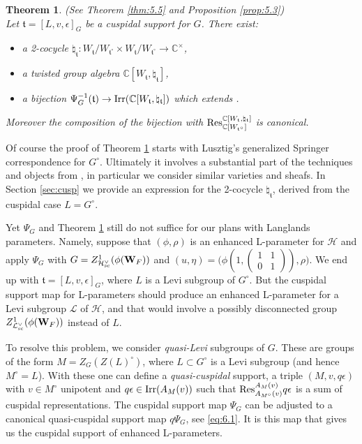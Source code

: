 \documentclass[11pt]{amsart}
\newtheorem{thmintro}{Theorem}
\theoremstyle{definition}
\newcommand{\mb}{\mathbf}
\newcommand{\C}{\mathbb C}
\newcommand{\matje}[4]{\left(\begin{smallmatrix} #1 & #2 \\ 
#3 & #4 \end{smallmatrix}\right)}
\def\Irr{{\rm Irr}}
\def\cL{{\mathcal L}}
\def\cH{{\mathcal H}}
\def\ft{{\mathfrak t}}
\def\Res{{\rm Res}}
\def\sc{{\rm sc}}
\begin{document}
\begin{thmintro}\label{thm:D} 
(See Theorem \ref{thm:5.5} and Proposition \ref{prop:5.3}) \\
Let $\ft = [L,v,\epsilon]_G$ be a cuspidal support for $G$. There exist:
\begin{itemize}
\item a 2-cocycle $\natural_\ft\colon  W_\ft / W_{\ft^\circ} \times  
W_\ft / W_{\ft^\circ} \to \C^\times$,
\item a twisted group algebra $\C [W_\ft,\natural_\ft]$,
\item a bijection $\Psi_G^{-1}(\ft) \to \Irr (\C [W_\ft,\natural_\ft])$
which extends \cite{Lus1}.
\end{itemize}
Moreover the composition of the bijection with 
$\Res^{\C [W_\ft,\natural_\ft]}_{\C [W_{\ft^\circ}]}$ is canonical.
\end{thmintro}

Of course the proof of Theorem \ref{thm:D} starts with Lusztig's generalized
Springer correspondence for $G^\circ$. Ultimately it involves a substantial
part of the techniques and objects from \cite{Lus1}, in particular we consider
similar varieties and sheafs. In Section \ref{sec:cusp} we provide an expression
for the 2-cocycle $\natural_\ft$, derived from the cuspidal case $L = G^\circ$.

Yet $\Psi_G$ and Theorem \ref{thm:D} still do not suffice for our plans with 
Langlands parameters. Namely, suppose that $(\phi,\rho)$ is an enhanced L-parameter
for $\cH$ and apply $\Psi_G$ with $G = Z^1_{\cH^\vee_\sc}(\phi (\mb W_F))$ and 
$(u,\eta) = \big( \phi (1,\matje{1}{1}{0}{1}), \rho \big)$. We end up with 
$\ft = [L,v,\epsilon]_G$, where $L$ is a Levi subgroup of $G^\circ$. But the
cuspidal support map for L-parameters should produce an enhanced L-parameter for
a Levi subgroup $\cL$ of $\cH$, and that would involve a possibly disconnected
group $Z^1_{\cL^\vee_\sc}(\phi (\mb W_F))$ instead of $L$.

To resolve this problem, we consider \emph{quasi-Levi} subgroups of $G$. These are
groups of the form $M = Z_G (Z(L)^\circ)$, where $L \subset G^\circ$ is a Levi
subgroup (and hence $M^\circ = L$). With these one can define a \emph{quasi-cuspidal} 
support, a triple $(M,v,q\epsilon)$ with $v \in M^\circ$ unipotent and 
$q \epsilon \in \Irr (A_M (v))$ such that $\Res^{A_M (v)}_{A_{M^\circ}(v)} q \epsilon$
is a sum of cuspidal representations. The cuspidal support map $\Psi_G$ can be
adjusted to a canonical quasi-cuspidal support map $q \Psi_G$, see \eqref{eq:6.1}.
It is this map that gives us the cuspidal support of enhanced L-parameters.
\end{document}
